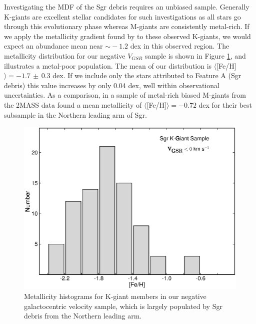 \documentclass[preprint2]{aastex}
\begin{document}
	Investigating the MDF of the Sgr debris requires an unbiased sample. Generally K-giants are excellent stellar candidates for such investigations as all stars go through this evolutionary phase whereas M-giants are consistently metal-rich. If we apply the metallicity gradient found by \citet[][from M-giants]{Keller;Yong;Da_Costa_2010} to these observed K-giants, we would expect an abundance mean near $\sim{}-1.2$ dex in this observed region. The metallicity distribution for our negative $V_{GSR}$ sample is shown in Figure \ref{fig:sgr-metallicity-hist}, and illustrates a metal-poor population. The mean of our distribution is $\langle$[Fe/H]$\rangle = -1.7\,\pm\,0.3$ dex. If we include only the stars attributed to Feature A (Sgr debris) this value increases by only 0.04 dex, well within observational uncertainties. As a comparison, in a sample of metal-rich biased M-giants from the 2MASS data \citet{Chou;et-al_2007} found a mean metallicity of $\langle$[Fe/H]$\rangle = -0.72$ dex for their best subsample in the Northern leading arm of Sgr.
	
	\begin{figure}[h]
		\includegraphics[width=\columnwidth]{./figures/fehhist.eps}
		\caption{Metallicity histograms for K-giant members in our negative galactocentric velocity sample, which is largely populated by Sgr debris from the Northern leading arm.}
		\label{fig:sgr-metallicity-hist}
	\end{figure}
\end{document}
